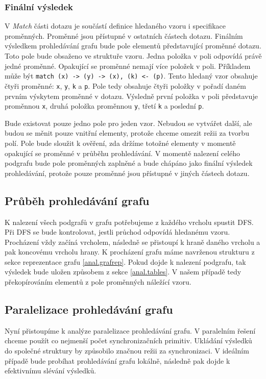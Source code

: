 \subsubsection{Finální výsledek}

V \textit{Match} části dotazu je součástí definice hledaného vzoru i specifikace proměnných.
Proměnné jsou přístupné v ostatních částech dotazu.
Finálním výsledkem prohledávání grafu bude pole elementů představující proměnné dotazu.
Toto pole bude obsaženo ve struktuře vzoru.
Jedna položka v poli odpovídá právě jedné proměnné.
Opakující se proměnné nemají více položek v poli.
Příkladem může být \texttt{match (x) -> (y) -> (x), (k) <- (p)}.
Tento hledaný vzor obsahuje čtyři proměnné: \texttt{x}, \texttt{y}, \texttt{k} a \texttt{p}.
Pole tedy obsahuje čtyři položky v pořadí daném prvním výskytem proměnné v dotazu.
Výsledně první položka v poli představuje proměnnou \texttt{x}, druhá položka proměnnou \texttt{y}, třetí \texttt{k} a poslední \texttt{p}.

Bude existovat pouze jedno pole pro jeden vzor. 
Nebudou se vytvářet další, ale budou se měnit pouze vnitřní elementy, protože chceme omezit režii za tvorbu polí.
Pole bude sloužit k ověření, zda držíme totožné elementy v momentě opakující se proměnné v průběhu prohledávání.
V momentě nalezení celého podgrafu bude pole proměnných zaplněné a bude chápáno jako finální výsledek prohledávání, protože pouze proměnné jsou přístupné v jiných částech dotazu.

\subsection{Průběh prohledávání grafu}

K nalezení všech podgrafů v grafu potřebujeme z každého vrcholu spustit DFS.
Při DFS se bude kontrolovat, jestli průchod odpovídá hledanému vzoru.
Procházení vždy začíná vrcholem, následně se přistoupí k hraně daného vrcholu a pak koncovému vrcholu hrany. 
K procházení grafu máme navrženou strukturu z sekce reprezentace grafu \ref{anal.grafrep}.
Pokud dojde k nalezení podgrafu, tak výsledek bude uložen způsobem z sekce \ref{anal.tables}.
V našem případě tedy překopírováním elementů z pole proměnných náležící vzoru.
\subsection{Paralelizace prohledávání grafu} \label{anal.matchPar}

Nyní přistoupíme k analýze paralelizace prohledávání grafu.
V paralelním řešení chceme použít co nejmenší počet synchronizačních primitiv.
Ukládání výsledků do společné struktury by způsobilo značnou režii za synchronizaci.
V ideálním případě bude probíhat prohledávání grafu lokálně, následně pak dojde k efektivnímu slévání výsledků.

